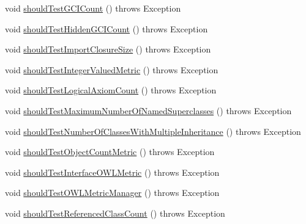 \begin{DoxyCompactItemize}
\item 
void \hyperlink{classorg_1_1semanticweb_1_1owlapi_1_1contract_1_1_contract_metrics_test_a336d385c96e3762ecee72774d0be8aa8}{should\-Test\-G\-C\-I\-Count} ()  throws Exception 
\item 
void \hyperlink{classorg_1_1semanticweb_1_1owlapi_1_1contract_1_1_contract_metrics_test_a3933c9cb47bc0b92ce0f0c6442508f93}{should\-Test\-Hidden\-G\-C\-I\-Count} ()  throws Exception 
\item 
void \hyperlink{classorg_1_1semanticweb_1_1owlapi_1_1contract_1_1_contract_metrics_test_a137160e1a3ebe048bb1e7df736971ef5}{should\-Test\-Import\-Closure\-Size} ()  throws Exception 
\item 
void \hyperlink{classorg_1_1semanticweb_1_1owlapi_1_1contract_1_1_contract_metrics_test_ab4fa3beb68bda5f828ba556479d0e3bb}{should\-Test\-Integer\-Valued\-Metric} ()  throws Exception 
\item 
void \hyperlink{classorg_1_1semanticweb_1_1owlapi_1_1contract_1_1_contract_metrics_test_ad9c7411979a36e071d4b88d8cc635479}{should\-Test\-Logical\-Axiom\-Count} ()  throws Exception 
\item 
void \hyperlink{classorg_1_1semanticweb_1_1owlapi_1_1contract_1_1_contract_metrics_test_a83f7afe84c4fb3d33be2300d58866bee}{should\-Test\-Maximum\-Number\-Of\-Named\-Superclasses} ()  throws Exception 
\item 
void \hyperlink{classorg_1_1semanticweb_1_1owlapi_1_1contract_1_1_contract_metrics_test_a3a82069e8d334ee03bc21582fdf32f5d}{should\-Test\-Number\-Of\-Classes\-With\-Multiple\-Inheritance} ()  throws Exception 
\item 
void \hyperlink{classorg_1_1semanticweb_1_1owlapi_1_1contract_1_1_contract_metrics_test_a4b541316e1e9fa20c619731ac51e03e8}{should\-Test\-Object\-Count\-Metric} ()  throws Exception 
\item 
void \hyperlink{classorg_1_1semanticweb_1_1owlapi_1_1contract_1_1_contract_metrics_test_a6819e6c7731e9afe8c3c58452f9dea6c}{should\-Test\-Interface\-O\-W\-L\-Metric} ()  throws Exception 
\item 
void \hyperlink{classorg_1_1semanticweb_1_1owlapi_1_1contract_1_1_contract_metrics_test_ab00deb249cfe76550ec337c2c1afc9d2}{should\-Test\-O\-W\-L\-Metric\-Manager} ()  throws Exception 
\item 
void \hyperlink{classorg_1_1semanticweb_1_1owlapi_1_1contract_1_1_contract_metrics_test_a1e57bb2bd797c07ef34587e2ad3e327c}{should\-Test\-Referenced\-Class\-Count} ()  throws Exception 
\item 

\end{DoxyCompactItemize}
